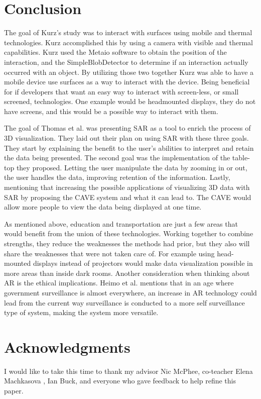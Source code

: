 \documentclass{sig-alternate}
\begin{document}
\section{Conclusion}
\label{Conclusion}
The goal of  Kurz's study was to interact with surfaces using mobile and thermal technologies. Kurz \cite{Thermal} accomplished this by using a camera with visible and thermal capabilities. Kurz used the Metaio software to obtain the position of the interaction, and the SimpleBlobDetector to determine if an interaction actually occurred with an object. By utilizing those two together Kurz was able to have a mobile device use surfaces as a way to interact with the device. Being beneficial for if developers that want an easy way to interact with screen-less, or small screened, technologies. One example would be headmounted displays, they do not have screens, and this would be a possible way to interact with them. 

The goal of Thomas et al. \cite{3D} was presenting SAR as a tool to enrich the process of 3D visualization. They laid out their plan on using SAR with these three goals. They start by explaining the benefit to the user’s abilities to interpret and retain the data being presented. The second goal was the implementation of the table-top they proposed. Letting the user manipulate the data by zooming in or out, the user handles the data, improving retention of the information. Lastly, mentioning that increasing the possible applications of visualizing 3D data with SAR by proposing the CAVE system and what it can lead to. The CAVE would allow more people to view the data being displayed at one time.

As mentioned above, education and transportation are just a few areas that would benefit from the union of these technologies. Working together to combine strengths, they reduce the weaknesses the methods had prior, but they also will share the weaknesses that were not taken care of. For example using head-mounted displays instead of projectors would make data visualization possible in more areas than inside dark rooms. Another consideration when thinking about AR is the ethical implications. Heimo et al. \cite{ethics} mentions that in an age where government surveillance is almost everywhere, an increase in AR technology could lead from the current way surveillance is conducted to a more self surveillance type of system, making the system more versatile.


\section{Acknowledgments}
\label{sec:Acknowledgments}
I would like to take this time to thank my advisor Nic McPhee, co-teacher Elena Machkasova   , Ian Buck, and everyone who gave feedback to help refine this paper. 


\end{document}
